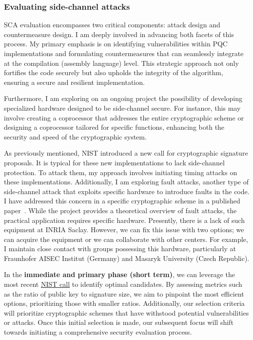 \documentclass[11pt, a4paper]{article}
\begin{document}
\subsubsection*{Evaluating side-channel attacks}

SCA evaluation encompasses two critical components: attack design and countermeasure design. I am deeply involved in advancing both facets of this process. My primary emphasis is on identifying vulnerabilities within PQC implementations and formulating countermeasures that can seamlessly integrate at the compilation (assembly language) level. 
This strategic approach not only fortifies the code securely but also upholds the integrity of the algorithm, ensuring a secure and resilient implementation.

Furthermore, I am exploring on an ongoing project the possibility of developing specialized hardware designed to be side-channel secure. For instance, this may involve creating a coprocessor that addresses the entire cryptographic scheme or designing a coprocessor tailored for specific functions, enhancing both the security and speed of the cryptographic system.

As previously mentioned, NIST introduced a new call for cryptographic signature proposals. It is typical for these new implementations to lack side-channel protection. To attack them, my approach involves initiating timing attacks on these implementations. Additionally, I am exploring fault attacks, another type of side-channel attack that exploits specific hardware to introduce faults in the code. I have addressed this concern in a specific cryptographic scheme in a published paper~\cite{BanegasKLMPRST23}. While the project provides a theoretical overview of fault attacks, the practical application requires specific hardware. Presently, there is a lack of such equipment at INRIA Saclay. However, we can fix this issue with two options; we can acquire the equipment or we can collaborate with other centers. For example, I maintain close contact with groups possessing this hardware, particularly at Fraunhofer AISEC Institut (Germany) and Masaryk University (Czech Republic).

In the \textbf{immediate and primary phase (short term)}, we can leverage the most recent \href{https://csrc.nist.gov/Projects/pqc-dig-sig/round-1-additional-signatures}{NIST call} to identify optimal candidates. By assessing metrics such as the ratio of public key to signature size, we aim to pinpoint the most efficient options, prioritizing those with smaller ratios. Additionally, our selection criteria will prioritize cryptographic schemes that have withstood potential vulnerabilities or attacks. Once this initial selection is made, our subsequent focus will shift towards initiating a comprehensive security evaluation process.
\end{document}
